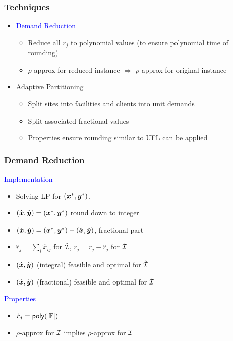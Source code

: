 \documentclass[hyperref,dvipsnames,svgnames,compress]{beamer}
\begin{document}
\begin{frame}
  \frametitle{Techniques}
  \begin{itemize}\addtolength{\itemsep}{1\baselineskip}

  \item<1> {\Large \textcolor{blue}{Demand Reduction}}
    \vspace{.1in}
    \begin{itemize}\addtolength{\itemsep}{1\baselineskip}
    \item  {\large Reduce all $r_j$ to polynomial values (to ensure polynomial time of
						rounding)}
    \item  {\large $\rho$-approx for reduced instance $\Rightarrow$ $\rho$-approx for original instance }
    \end{itemize}
    
  \item<0> {\Large {Adaptive Partitioning}}
    \vspace{.1in}
    \begin{itemize}\addtolength{\itemsep}{1\baselineskip}
    \item {\large Split sites into facilities and clients into unit demands}
    \item {\large Split associated fractional values}
    \item {\large Properties ensure rounding similar to UFL can be applied}
    \end{itemize}
  \end{itemize}
\end{frame}

\begin{frame}
  \frametitle{Demand Reduction}

  \large{\textcolor{blue}{Implementation}}

  \begin{itemize}
  \item Solving LP for $(\boldsymbol{x}^\ast, \boldsymbol{y}^\ast)$.
  \item $(\hat{\boldsymbol{x}}, \hat{\boldsymbol{y}}) = (\boldsymbol{x}^\ast, \boldsymbol{y}^\ast)$ round down to integer
  \item $(\dot{\boldsymbol{x}}, \dot{\boldsymbol{y}}) = (\boldsymbol{x}^\ast, \boldsymbol{y}^\ast) - (\hat{\boldsymbol{x}}, \hat{\boldsymbol{y}})$, fractional part
  \item $\hat r_j = \sum_{i}\hat x_{ij}$ for $\hat{\mathcal{I}}$, $\dot r_j = r_j - \hat r_j$ for $\dot{\mathcal{I}}$
  \item $(\hat{\boldsymbol{x}}, \hat{\boldsymbol{y}})$ (integral) feasible and optimal for $\hat{\mathcal{I}}$
  \item $(\dot{\boldsymbol{x}}, \dot{\boldsymbol{y}})$ (fractional) feasible and optimal for $\dot{\mathcal{I}}$
  \end{itemize}
  
  \large{\textcolor{blue}{Properties}}

  \begin{itemize}
  \item ${\dot r}_j = {\mbox{\sf poly}}(|\mathbb{F}|)$
  \item $\rho$-approx for $\dot {\mathcal{I}}$ implies $\rho$-approx for $\mathcal{I}$
  \end{itemize}
\end{frame}
\end{document}
